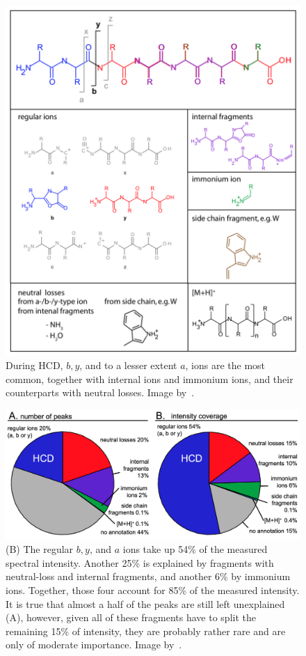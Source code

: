\begin{figure}
  \centering
  \includegraphics[width=.9\linewidth]{img/fragment-types-hcd.png}
  \caption{During HCD, \(b, y\), and to a lesser extent \(a\), ions are the most common, together with internal ions and immonium ions, and their counterparts with neutral losses. Image by~\citet{michalski2012systematic}.}\label{fig:fragment-types-hcd}
\end{figure}

\begin{figure}
  \centering
  \includegraphics[width=.9\linewidth]{img/hcd.png}
  \caption{(B) The regular \(b, y\), and \(a\) ions take up 54\% of the measured spectral intensity. Another 25\% is explained by fragments with neutral-loss and internal fragments, and another 6\% by immonium ions. Together, those four account for 85\% of the measured intensity. It is true that almost a half of the peaks are still left unexplained (A), however, given all of these fragments have to split the remaining 15\% of intensity, they are probably rather rare and are only of moderate importance. Image by~\citet{michalski2012systematic}.}\label{fig:hcd}
\end{figure}

